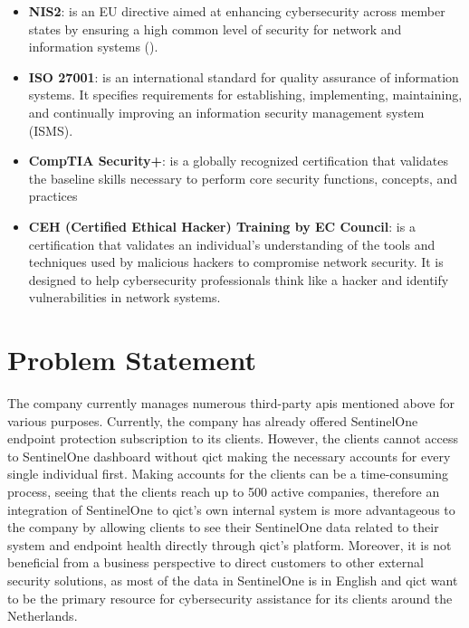 \begin{itemize}
      \item \textbf{NIS2}: is an EU directive aimed at enhancing cybersecurity across member states by ensuring a high common level of security
            for network and information systems (\textit{\cite{nis2}}).
      \item \textbf{ISO 27001}: is an international standard for quality assurance of information systems. It specifies requirements for
            establishing, implementing, maintaining, and continually improving an information security management system (ISMS).
      \item \textbf{CompTIA Security+}: is a globally recognized certification that validates the baseline skills necessary to perform core
            security functions, concepts, and practices
      \item \textbf{CEH (Certified Ethical Hacker) Training by EC Council}: is a certification that validates an individual's understanding of the tools and techniques
            used by malicious hackers to compromise network security. It is designed to help cybersecurity professionals think like a hacker and
            identify vulnerabilities in network systems.
\end{itemize}

\section{Problem Statement}

The company currently manages numerous third-party \acrshort{api}s mentioned above for various purposes.
Currently, the company has already offered SentinelOne endpoint protection subscription to its clients.
However, the clients cannot access to SentinelOne dashboard without \acrshort{qict} making the
necessary accounts for every single individual first. Making accounts for the clients can be a time-consuming process,
seeing that the clients reach up to 500 active companies, therefore an integration of SentinelOne
to \acrshort{qict}'s own internal system is more advantageous to the company by allowing clients to see
their SentinelOne data related to their system and endpoint health directly through \acrshort{qict}'s
platform. Moreover, it is not beneficial from a business perspective to direct customers to other external
security solutions, as most of the data in SentinelOne is in English and \acrshort{qict} want to be the
primary resource for cybersecurity assistance for its clients around the Netherlands.


